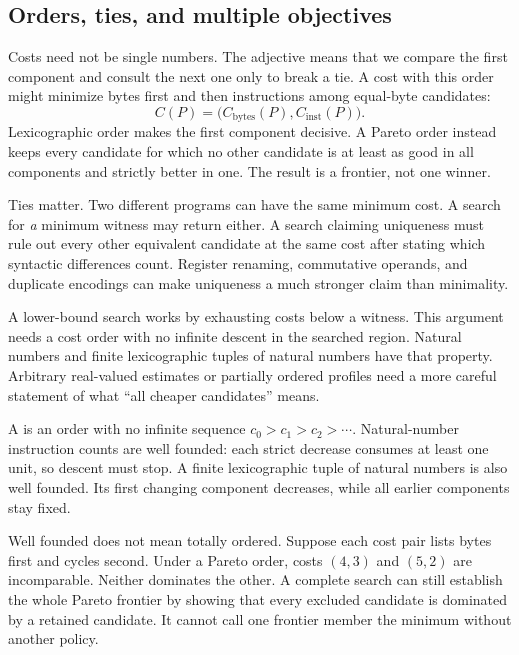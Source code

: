 \subsection{Orders, ties, and multiple objectives}

Costs need not be single numbers. The adjective  means
that we compare the first component and consult the next one only to break a
tie. A cost with this order might minimize bytes first and then instructions
among equal-byte candidates:
\[
 C(P)=\bigl(C_{\mathrm{bytes}}(P),C_{\mathrm{inst}}(P)\bigr).
\]
Lexicographic order makes the first component decisive. A Pareto order instead
keeps every candidate for which no other candidate is at least as good in all
components and strictly better in one. The result is a frontier, not one
winner.

Ties matter. Two different programs can have the same minimum cost. A search
for \emph{a} minimum witness may return either. A search claiming uniqueness
must rule out every other equivalent candidate at the same cost after stating
which syntactic differences count. Register renaming, commutative operands,
and duplicate encodings can make uniqueness a much stronger claim than
minimality.

\begin{goingdeeper}[title={Well-founded cost orders}]
A lower-bound search works by exhausting costs below a witness. This argument
needs a cost order with no infinite descent in the searched region. Natural
numbers and finite lexicographic tuples of natural numbers have that property.
Arbitrary real-valued estimates or partially ordered profiles need a more
careful statement of what ``all cheaper candidates'' means.
\end{goingdeeper}

A  is an order with no infinite sequence
\(c_0>c_1>c_2>\cdots\). Natural-number instruction counts are well founded:
each strict decrease consumes at least one unit, so descent must stop. A finite
lexicographic tuple of natural numbers is also well founded. Its first changing
component decreases, while all earlier components stay fixed.

Well founded does not mean totally ordered. Suppose each cost pair lists bytes
first and cycles second. Under a Pareto order, costs \((4,3)\) and \((5,2)\)
are incomparable. Neither dominates the other. A complete search can still
establish the whole Pareto frontier by
showing that every excluded candidate is dominated by a retained candidate.
It cannot call one frontier member the minimum without another policy.

